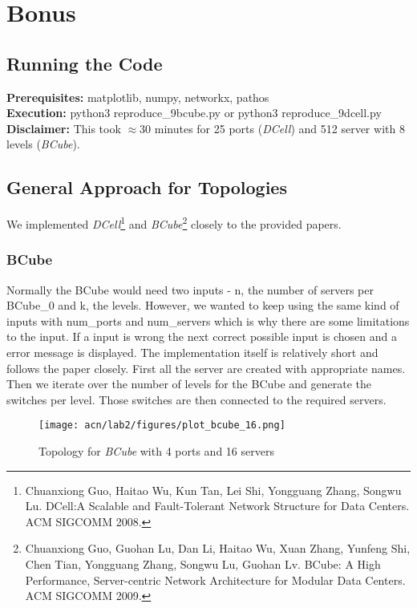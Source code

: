 \documentclass[a4paper,11pt]{article}
\begin{document}
\section{Bonus}


\subsection{Running the Code}

\textbf{Prerequisites:} matplotlib, numpy, networkx, pathos\\
\textbf{Execution:} python3 reproduce\_9bcube.py or python3 reproduce\_9dcell.py\\
\textbf{Disclaimer:} This took $\approx$30 minutes for 25 ports (\textit{DCell}) and 512 server with 8 levels (\textit{BCube}).

\subsection{General Approach for Topologies}
We implemented \textit{DCell}\footnote{Chuanxiong Guo, Haitao Wu, Kun Tan, Lei Shi, Yongguang Zhang, Songwu Lu. DCell:A Scalable and Fault-Tolerant Network Structure for Data Centers. ACM SIGCOMM 2008.} and \textit{BCube}\footnote{Chuanxiong Guo, Guohan Lu, Dan Li, Haitao Wu, Xuan Zhang, Yunfeng Shi, Chen Tian, Yongguang Zhang, Songwu Lu, Guohan Lv. BCube: A High Performance, Server-centric Network Architecture for Modular Data Centers. ACM SIGCOMM 2009.} closely to the provided papers.

\subsubsection{BCube}
Normally the BCube would need two inputs - n, the number of servers per BCube\_0 and k, the levels.
However, we wanted to keep using the same kind of inputs with num\_ports and num\_servers which is why there are some limitations to the input.
If a input is wrong the next correct possible input is chosen and a error message is displayed.
The implementation itself is relatively short and follows the paper closely.
First all the server are created with appropriate names.
Then we iterate over the number of levels for the BCube and generate the switches per level.
Those switches are then connected to the required servers.

\begin{figure}[ht]
    \centering
    \texttt{[image: acn/lab2/figures/plot\_bcube\_16.png]}
    \caption{Topology for \textit{BCube} with 4 ports and 16 servers}
    \label{fig:topo_dcell}
\end{figure}
\end{document}
